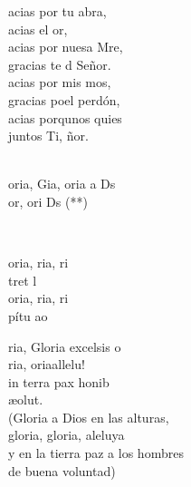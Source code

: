 \documentclass[12pt]{article}
\begin{document}
\begin{multicols*}{2}
\begin{cancion}
	acias por tu abra, \\
	acias  el or,\\
	acias por nuesa Mre, \\
	gracias te d Señor.\\
	acias por mis mos, \\
	gracias poel perdón,\\
	acias porqunos quies\\
	juntos Ti, ñor.\\\jump\\
	\begin{chorus}%
	oria, Gia, oria a Ds\\
	or, ori Ds (**)\\
	\end{chorus}%
	\jump\\
\end{cancion}%

\begin{cancion}[Gloria (Do)][]%
	oria, ria, ri\\
	tret l\\
	oria, ria, ri\\
	pítu ao\\
\end{cancion}%

\begin{cancion}%
	ria, Gloria  excelsis o\\
	ria, oriaallelu! \\
	in terra pax honib\\
	æolut.\\
(Gloria a Dios en las alturas, \\
 gloria, gloria, aleluya\\
 y en la tierra paz a los hombres \\
 de buena voluntad)\\
\end{cancion}%


\end{multicols*}
\end{document}

